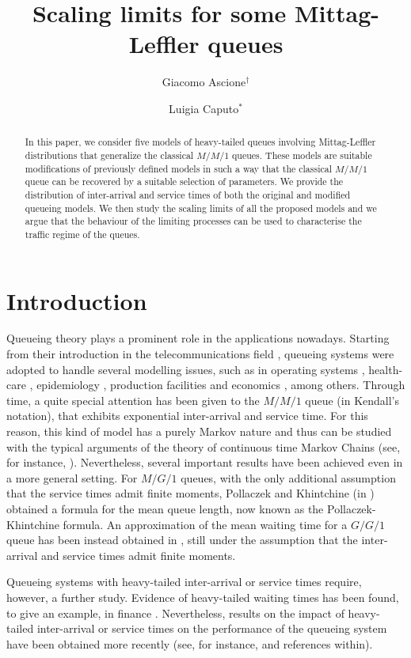 \documentclass[]{amsart}
\title[Scaling limits for Mittag-Leffler queues]{Scaling limits for some  Mittag-Leffler queues}
\author{Giacomo Ascione$^\dagger$}
\author{Luigia Caputo$^\ast$}
\numberwithin{equation}{section}
\theoremstyle{remark}
\theoremstyle{definition}
\providecommand{\subclass}[1]{\textbf{\textit{MSC 2010 Classification---}} #1\\}
\begin{document}
\maketitle
\begin{abstract}
In this paper, we consider five models of heavy-tailed queues involving Mittag-Leffler distributions that generalize the classical $M/M/1$ queues. These models are suitable modifications of previously defined models in such a way that the classical $M/M/1$ queue can be recovered by a suitable selection of parameters. We provide the distribution of inter-arrival and service times of both the original and modified queueing models. We then study the scaling limits of all the proposed models and we argue that the behaviour of the limiting processes can be used to characterise the traffic regime of the queues.
\end{abstract}
\section{Introduction}
Queueing theory plays a prominent role in the applications nowadays. Starting from their introduction in the telecommunications field \cite{erlang1909}, queueing systems were adopted to handle several modelling issues, such as in operating systems \cite{silberschatz2013operating}, health-care \cite{mayhew2006using}, epidemiology \cite{hernandez2010application}, production facilities \cite{carlson1992simulation} and economics \cite{radivojevic2014ergodic}, among others. Through time, a quite special attention has been given to the $M/M/1$ queue (in Kendall's notation), that exhibits exponential inter-arrival and service time. For this reason, this kind of model has a purely Markov nature and thus can be studied with the typical arguments of the theory of continuous time Markov Chains (see, for instance, \cite{sharma1990}). Nevertheless, several important results have been achieved even in a more general setting. For $M/G/1$ queues, with the only additional assumption that the service times admit finite moments, Pollaczek and Khintchine (in \cite{pollaczek1930aufgabe,khintchine1932}) obtained a formula for the mean queue length, now known as the Pollaczek-Khintchine formula. An approximation of the mean waiting time for a $G/G/1$ queue has been instead obtained in \cite{kingman1961single}, still under the assumption that the inter-arrival and service times admit finite moments.

Queueing systems with heavy-tailed inter-arrival or service times require, however, a further study. Evidence of heavy-tailed waiting times has been found, to give an example, in finance \cite{sabatelli2002waiting,raberto2002waiting}. Nevertheless, results on the impact of heavy-tailed inter-arrival or service times on the performance of the queueing system have been obtained more recently (see, for instance, \cite{whitt2000impact} and references within). 
\end{document}
